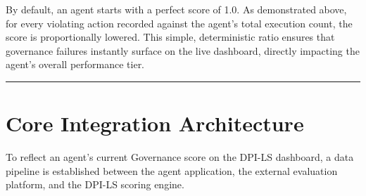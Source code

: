 \documentclass[11pt,a4paper]{article}
\begin{document}
By default, an agent starts with a perfect score of 1.0. As demonstrated above, for every violating action recorded against the agent's total execution count, the score is proportionally lowered. This simple, deterministic ratio ensures that governance failures instantly surface on the live dashboard, directly impacting the agent's overall performance tier.

\vspace{0.5cm}
\hrule
\vspace{0.5cm}

\section{Core Integration Architecture}

To reflect an agent's current Governance score on the DPI-LS dashboard, a data pipeline is established between the agent application, the external evaluation platform, and the DPI-LS scoring engine.
\end{document}
